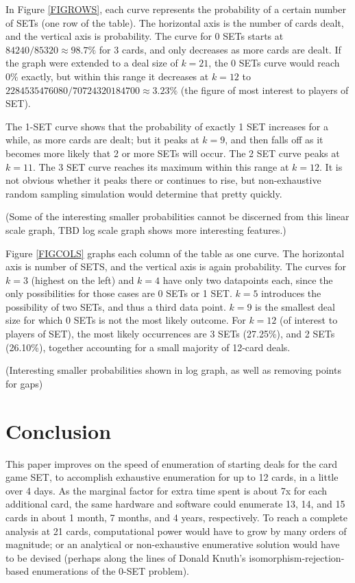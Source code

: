 \documentclass[10pt]{amsart}
\newcommand{\SET}{SET\texttrademark}  %
\begin{document}
In Figure \ref{FIGROWS}, each curve represents the probability of a certain
number of SETs (one row of the table). The horizontal axis is the number of
cards dealt, and the vertical axis is probability. The curve for 0 SETs starts
at $84240/85320\approx 98.7\%$ for 3 cards, and only decreases as more cards are
dealt. If the graph were extended to a deal size of $k=21$, the 0 SETs curve
would reach $0\%$ exactly, but within this range it decreases at $k=12$ to
$2284535476080/70724320184700\approx 3.23\%$ (the figure of most interest to
players of \SET).

The 1-SET curve shows that the probability of exactly 1 SET increases for a
while, as more cards are dealt; but it peaks at $k=9$, and then falls off as it
becomes more likely that 2 or more SETs will occur. The 2 SET curve peaks at
$k=11$. The 3 SET curve reaches its maximum within this range at $k=12$. It is
not obvious whether it peaks there or continues to rise, but non-exhaustive
random sampling simulation would determine that pretty quickly.

(Some of the interesting smaller probabilities cannot be discerned from this
linear scale graph, TBD log scale graph shows more interesting features.)

Figure \ref{FIGCOLS} graphs each column of the table as one curve. The
horizontal axis is number of SETS, and the vertical axis is again
probability. The curves for $k=3$ (highest on the left) and $k=4$ have only two
datapoints each, since the only possibilities for those cases are 0 SETs or 1
SET. $k=5$ introduces the possibility of two SETs, and thus a third data
point. $k=9$ is the smallest deal size for which 0 SETs is not the most likely
outcome. For $k=12$ (of interest to players of \SET), the most likely
occurrences are 3 SETs (27.25\%), and 2 SETs (26.10\%), together accounting for
a small majority of 12-card deals.

(Interesting smaller probabilities shown in log graph, as well as removing
points for gaps)



\section{Conclusion}
This paper improves on the speed of enumeration of starting deals for the card
game \SET, to accomplish exhaustive enumeration for up to 12 cards, in a little
over 4 days. As the marginal factor for extra time spent is about 7x for each
additional card, the same hardware and software could enumerate 13, 14, and 15
cards in about 1 month, 7 months, and 4 years, respectively. To reach a complete
analysis at 21 cards, computational power would have to grow by many orders of
magnitude; or an analytical or non-exhaustive enumerative solution would have to
be devised (perhaps along the lines of Donald Knuth's
isomorphism-rejection-based enumerations of the 0-SET problem).
\end{document}
